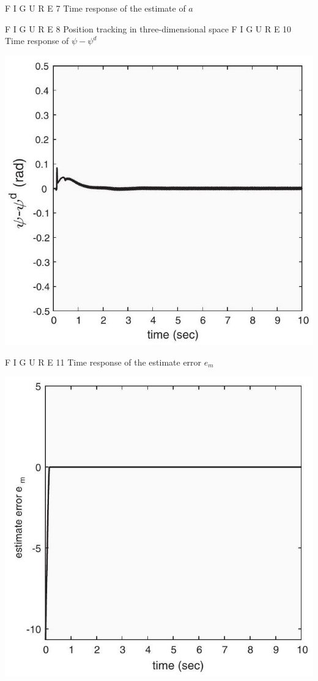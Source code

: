 \documentclass[10pt]{article}
\begin{document}
F I G U R E 7 Time response of the estimate of $a$

F I G U R E 8 Position tracking in three-dimensional space F I G U R E 10 Time response of $\psi-\psi^{d}$

\begin{center}
\includegraphics[max width=\textwidth]{2023_10_07_eefdf58cc80a47c1244eg-13(1)}
\end{center}

F I G U R E 11 Time response of the estimate error $e_{m}$

\begin{center}
\includegraphics[max width=\textwidth]{2023_10_07_eefdf58cc80a47c1244eg-13}
\end{center}
\end{document}
